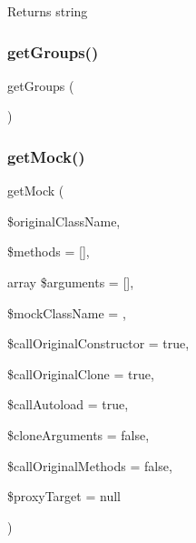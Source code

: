\begin{DoxyReturn}{Returns}
string 
\end{DoxyReturn}
\mbox{\label{class_p_h_p_unit___framework___test_case_a6187b4fda76a8055bd08acafa57d9824}} 
\subsubsection{\texorpdfstring{get\+Groups()}{getGroups()}}
{\footnotesize\ttfamily get\+Groups (\begin{DoxyParamCaption}{ }\end{DoxyParamCaption})}

\mbox{\label{class_p_h_p_unit___framework___test_case_a482f203808f2d0db3bff64bd0b65b8d6}} 
\subsubsection{\texorpdfstring{get\+Mock()}{getMock()}}
{\footnotesize\ttfamily get\+Mock (\begin{DoxyParamCaption}\item[{}]{\$original\+Class\+Name,  }\item[{}]{\$methods = {\ttfamily \mbox{[}\mbox{]}},  }\item[{array}]{\$arguments = {\ttfamily \mbox{[}\mbox{]}},  }\item[{}]{\$mock\+Class\+Name = {\ttfamily \textquotesingle{}\textquotesingle{}},  }\item[{}]{\$call\+Original\+Constructor = {\ttfamily true},  }\item[{}]{\$call\+Original\+Clone = {\ttfamily true},  }\item[{}]{\$call\+Autoload = {\ttfamily true},  }\item[{}]{\$clone\+Arguments = {\ttfamily false},  }\item[{}]{\$call\+Original\+Methods = {\ttfamily false},  }\item[{}]{\$proxy\+Target = {\ttfamily null} }\end{DoxyParamCaption})\hspace{0.3cm}{\ttfamily [protected]}}

